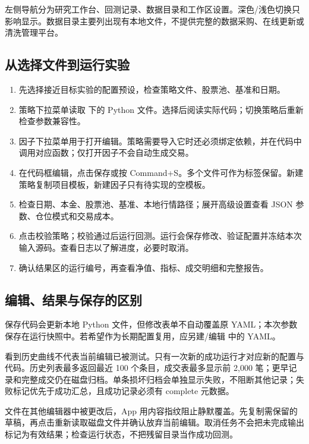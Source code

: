 \documentclass[UTF8,fontset=none,11pt]{ctexart}
\let\originalsubsection\subsection
\renewcommand{\subsection}{\Needspace{8\baselineskip}\originalsubsection}
\begin{document}
左侧导航分为研究工作台、回测记录、数据目录和工作区设置。深色/浅色切换只影响显示。数据目录主要列出现有本地文件，不提供完整的数据采购、在线更新或清洗管理平台。

\subsection{从选择文件到运行实验}
\begin{enumerate}
\item 先选择接近目标实验的配置预设，检查策略文件、股票池、基准和日期。
\item 策略下拉菜单读取  下的 Python 文件。选择后阅读实际代码；切换策略后重新检查参数兼容性。
\item 因子下拉菜单用于打开编辑。策略需要导入它时还必须绑定依赖，并在代码中调用对应函数；仅打开因子不会自动生成交易。
\item 在代码框编辑，点击保存或按 Command+S。多个文件可作为标签保留。新建策略复制项目模板，新建因子只有待实现的空模板。
\item 检查日期、本金、股票池、基准、本地行情路径；展开高级设置查看 JSON 参数、仓位模式和交易成本。
\item 点击校验策略；校验通过后运行回测。运行会保存修改、验证配置并冻结本次输入源码。查看日志以了解进度，必要时取消。
\item 确认结果区的运行编号，再查看净值、指标、成交明细和完整报告。
\end{enumerate}

\subsection{编辑、结果与保存的区别}
保存代码会更新本地 Python 文件，但修改表单不自动覆盖原 YAML；本次参数保存在运行快照中。若希望作为长期配置复用，应另建/编辑  中的 YAML。

看到历史曲线不代表当前编辑已被测试。只有一次新的成功运行才对应新的配置与代码。历史列表最多返回最近 100 个条目，成交表最多显示前 2,000 笔；更早记录和完整成交仍在磁盘归档。单条损坏归档会单独显示失败，不阻断其他记录；失败标记优先于成功汇总，且成功记录必须有 complete 元数据。

文件在其他编辑器中被更改后，App 用内容指纹阻止静默覆盖。先复制需保留的草稿，再点击重新读取磁盘文件并确认放弃当前编辑。取消任务不会把未完成输出标记为有效结果；检查运行状态，不把残留目录当作成功回测。
\end{document}
